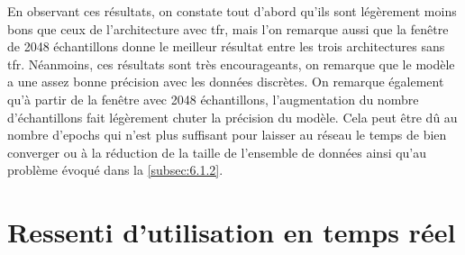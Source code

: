 \begin{table}[H]
\end{table}

En observant ces résultats, on constate tout d'abord qu'ils sont légèrement moins bons que ceux de l'architecture avec \gls{tfr}, mais l'on remarque aussi que la fenêtre de 2048 échantillons donne le meilleur résultat entre les trois architectures sans \gls{tfr}. Néanmoins, ces résultats sont très encourageants, on remarque que le modèle a une assez bonne précision avec les données discrètes. On remarque également qu'à partir de la fenêtre avec 2048 échantillons, l'augmentation du nombre d'échantillons fait légèrement chuter la précision du modèle. Cela peut être dû au nombre d'epochs qui n'est plus suffisant pour laisser au réseau le temps de bien converger ou à la réduction de la taille de l'ensemble de données ainsi qu'au problème évoqué dans la \autoref{subsec:6.1.2}.

\section{Ressenti d'utilisation en temps réel}
\label{sec:7.3}

